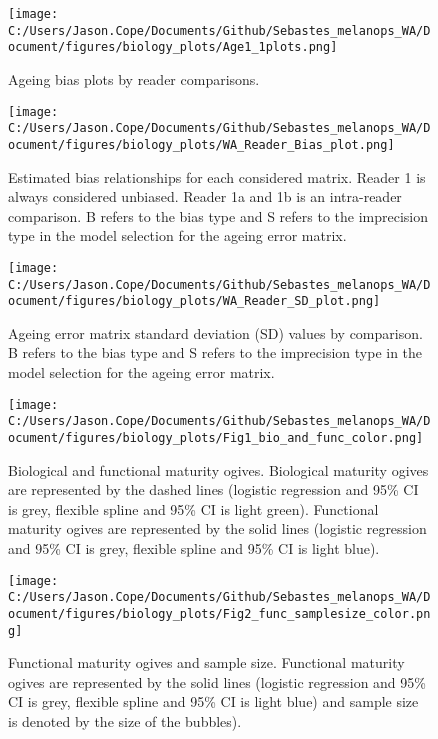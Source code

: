 \documentclass[11pt,
  english,
  letterpaper,
]{article}
\begin{document}
\clearpage

\begin{figure}
\centering
\texttt{[image: C:/Users/Jason.Cope/Documents/Github/Sebastes\_melanops\_WA/Document/figures/biology\_plots/Age1\_1plots.png]}
\caption{Ageing bias plots by reader comparisons.\label{fig:a1-bias}}
\end{figure}

\pagebreak

\begin{figure}
\centering
\texttt{[image: C:/Users/Jason.Cope/Documents/Github/Sebastes\_melanops\_WA/Document/figures/biology\_plots/WA\_Reader\_Bias\_plot.png]}
\caption{Estimated bias relationships for each considered matrix. Reader 1 is always considered unbiased. Reader 1a and 1b is an intra-reader comparison. B refers to the bias type and S refers to the imprecision type in the model selection for the ageing error matrix.\label{fig:age-error-bias}}
\end{figure}

\pagebreak

\begin{figure}
\centering
\texttt{[image: C:/Users/Jason.Cope/Documents/Github/Sebastes\_melanops\_WA/Document/figures/biology\_plots/WA\_Reader\_SD\_plot.png]}
\caption{Ageing error matrix standard deviation (SD) values by comparison. B refers to the bias type and S refers to the imprecision type in the model selection for the ageing error matrix.\label{fig:age-error-sd}}
\end{figure}

\pagebreak

\begin{figure}
\centering
\texttt{[image: C:/Users/Jason.Cope/Documents/Github/Sebastes\_melanops\_WA/Document/figures/biology\_plots/Fig1\_bio\_and\_func\_color.png]}
\caption{Biological and functional maturity ogives. Biological maturity ogives are represented by the dashed lines (logistic regression and 95\% CI is grey, flexible spline and 95\% CI is light green). Functional maturity ogives are represented by the solid lines (logistic regression and 95\% CI is grey, flexible spline and 95\% CI is light blue).\label{fig:bio-fxn-mat-color}}
\end{figure}

\pagebreak

\begin{figure}
\centering
\texttt{[image: C:/Users/Jason.Cope/Documents/Github/Sebastes\_melanops\_WA/Document/figures/biology\_plots/Fig2\_func\_samplesize\_color.png]}
\caption{Functional maturity ogives and sample size. Functional maturity ogives are represented by the solid lines (logistic regression and 95\% CI is grey, flexible spline and 95\% CI is light blue) and sample size is denoted by the size of the bubbles).\label{fig:fxn-spline-mat-color}}
\end{figure}
\end{document}
